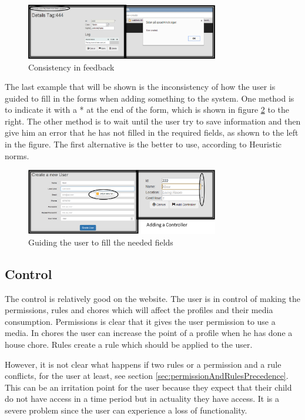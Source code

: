 \begin{figure}
	\centering
		\includegraphics[width=0.75\textwidth]{images/afteraddConsistency.png}
	\caption{Consistency in feedback}
	\label{fig:afteraddConsistency}
\end{figure}

The last example that will be shown is the inconsistency of how the user is guided to fill in the forms when adding something to the system. One method is to indicate it with a * at the end of the form, which is shown in figure \ref{fig:consistencyAddControllerUser} to the right. The other method is to wait until the user try to save information and then give him an error that he has not filled in the required fields, as shown to the left in the figure. The first alternative is the better to use, according to Heuristic norms.

\begin{figure}
	\centering
		\includegraphics[width=0.75\textwidth]{images/consistencyAddControllerUser.png}
	\caption{Guiding the user to fill the needed fields}
	\label{fig:consistencyAddControllerUser}
\end{figure}

 
\subsection{Control}
The control is relatively good on the website. The user is in control of making the permissions, rules and chores which will affect the profiles and their media consumption. Permissions is clear that it gives the user permission to use a media. In chores the user can increase the point of a profile when he has done a house chore. Rules create a rule which should be applied to the user. 

However, it is not clear what happens if two rules or a permission and a rule conflicts, for the user at least, see section \vref{sec:permissionAndRulesPrecedence}. 
This can be an irritation point for the user because they expect that their child do not have access in a time period but in actuality they have access. It is a severe problem since the user can experience a loss of functionality.     

